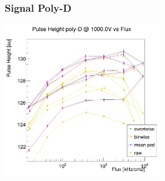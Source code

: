 \documentclass[9pt]{beamer}
\begin{document}
\begin{frame}
	\frametitle{Signal Poly-D}
	\begin{center}
		\includegraphics[width=7cm]{Pics/Dfullpos}
	\end{center}
\end{frame}
\end{document}
